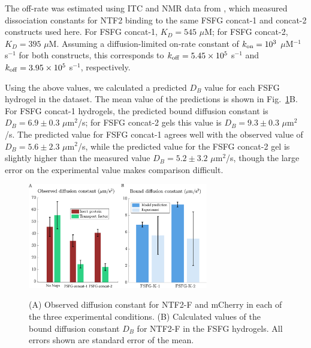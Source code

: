 The off-rate was estimated using ITC and NMR data from \cite{hayama18}, which measured dissociation constants for NTF2 binding to the same FSFG concat-1 and concat-2 constructs used here.  For FSFG concat-1, $K_D = 545$ $\mu$M; for FSFG concat-2, $K_D = 395$ $\mu$M.  Assuming a diffusion-limited on-rate constant of $k_{\rm on} = 10^3$ $\mu$M$^{-1}$ s$^{-1}$ for both constructs, this corresponds to $k_{\rm off} = 5.45 \times 10^5$ s$^{-1}$ and $k_{\rm off} = 3.95 \times 10^5$ s$^{-1}$, respectively.

Using the above values, we calculated a predicted $D_B$ value for each FSFG hydrogel in the dataset.  The mean value of the predictions is shown in Fig.~\ref{fig:bound-diffusion}B.  For FSFG concat-1 hydrogels, the predicted bound diffusion constant is $D_B = 6.9\pm0.3$ $\mu$m$^2$/s; for FSFG concat-2 gels this value is $D_B = 9.3\pm0.3$ $\mu$m$^2$/s.   The predicted value for FSFG concat-1 agrees well with the observed value of $D_B = 5.6\pm2.3$ $\mu$m$^2$/s, while the predicted value for the FSFG concat-2 gel is slightly higher than the measured value $D_B = 5.2\pm3.2$ $\mu$m$^2$/s, though the large error on the experimental value makes comparison difficult.

\begin{figure}
\caption[Observed diffusion constants and NTF2 bound diffusion.]{(A) Observed diffusion constant for NTF2-F and mCherry in each of the three experimental conditions. (B) Calculated values of the bound diffusion constant $D_B$ for NTF2-F in the FSFG hydrogels.  All errors shown are standard error of the mean.}
\centering
\includegraphics[width=0.7\textwidth]{figs/ch04/bound-diffusion}
\label{fig:bound-diffusion}
\end{figure} 



